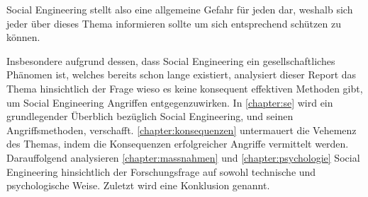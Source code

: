 Social Engineering stellt also eine allgemeine Gefahr für jeden dar, weshalb sich jeder über dieses
Thema informieren sollte um sich entsprechend schützen zu können.

Insbesondere aufgrund dessen, dass Social Engineering ein gesellschaftliches Phänomen ist, welches bereits
schon lange existiert, analysiert dieser Report das Thema hinsichtlich der Frage wieso es keine konsequent effektiven
Methoden gibt, um Social Engineering Angriffen entgegenzuwirken.
In \autoref{chapter:se} wird ein grundlegender Überblich bezüglich Social Engineering, und seinen Angriffsmethoden, verschafft.
\autoref{chapter:konsequenzen} untermauert die Vehemenz des Themas, indem die Konsequenzen erfolgreicher Angriffe vermittelt werden.
Darauffolgend analysieren \autoref{chapter:massnahmen} und \autoref{chapter:psychologie} Social Engineering hinsichtlich der
Forschungsfrage auf sowohl technische und psychologische Weise. Zuletzt wird eine Konklusion genannt.
